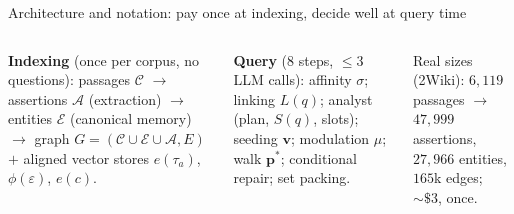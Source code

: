 \documentclass[aspectratio=169,10pt]{beamer}
\begin{document}
\begin{frame}{Architecture and notation: pay once at indexing, decide well at query time}
\begin{columns}[T]
\footnotesize
\textbf{Indexing} (once per corpus, no questions):
passages $\mathcal C$ $\to$ assertions $\mathcal A$ (extraction) $\to$
entities $\mathcal E$ (canonical memory) $\to$ graph
$G=(\mathcal C\cup\mathcal E\cup\mathcal A, E)$ $+$ aligned vector stores
$e(\tau_a)$, $\phi(\varepsilon)$, $e(c)$.

\textbf{Query} (8 steps, $\le3$ LLM calls): affinity $\sigma$; linking
$L(q)$; analyst (plan, $S(q)$, slots); seeding $\mathbf v$; modulation
$\mu$; walk $\mathbf p^{*}$; conditional repair; set packing.

\vspace{1mm}
Real sizes (2Wiki): $6{,}119$ passages $\to$ $47{,}999$ assertions,
$27{,}966$ entities, $165$k edges; ${\sim}\$3$, once.
\centering
{}
\end{columns}
\end{frame}
\end{document}

